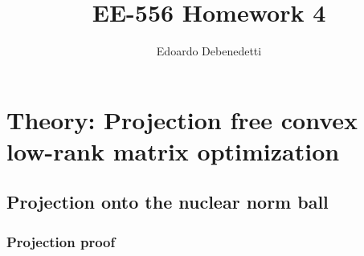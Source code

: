 \documentclass[12pt]{article}
\title{EE-556 Homework 4}
\author{Edoardo Debenedetti}
\begin{document}
\maketitle

\section{Theory: Projection free convex low-rank matrix optimization}

\subsection{Projection onto the nuclear norm ball}
\subsubsection{Projection proof}
\end{document}
